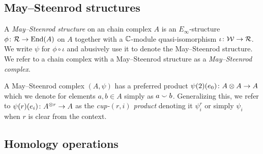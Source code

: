 



%
%

\subsection{May--Steenrod structures}

A \textit{May--Steenrod structure} on an chain complex $A$ is an $E_\infty$-structure $\phi \colon \mathcal{R} \to \mathrm{End}(A)$ on $A$ together with a $\mathbb{C}$-module quasi-isomorphism $\iota \colon \mathcal{W} \to \mathcal{R}$.
We write $\psi$ for $\phi \circ \iota$ and abusively use it to denote the May--Steenrod structure.
We refer to a chain complex with a May--Steenrod structure as a \textit{May--Steenrod complex}.

A May--Steenrod complex $(A,\psi)$ has a preferred product $\psi(2)(e_0) \colon A \otimes A \to A$ which we denote for elements $a, b \in A$ simply as $a \smallsmile b$.
Generalizing this, we refer to $\psi(r)(e_i) \colon A^{\otimes r} \to A$ as the \textit{cup-$(r,i)$ product} denoting it $\psi_i^r$ or simply $\psi_i$ when $r$ is clear from the context.

\subsection{Homology operations}

